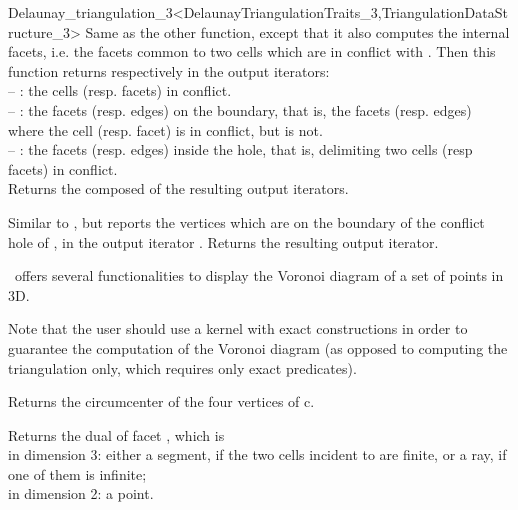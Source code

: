 \begin{ccRefClass}{Delaunay_triangulation_3<DelaunayTriangulationTraits_3,TriangulationDataStructure_3>}
{Same as the other  function, except that it also 
computes the internal facets, i.e. the facets common to two cells which
are in conflict with .
Then this function returns respectively in the output iterators:\\
-- : the cells (resp. facets) in conflict.\\
-- : the facets (resp. edges) on the boundary, that is, the facets
(resp. edges)  where the cell (resp. facet)  is in
conflict, but  is not.\\
-- : the facets (resp. edges) inside the hole, that is, delimiting
two cells (resp facets) in conflict.\\
Returns the  composed of the resulting output iterators.
}

{Similar to , but reports the vertices which are on the
boundary of the conflict hole of , in the output iterator .
Returns the resulting output iterator.
}



\cgal\ offers several functionalities to display the Voronoi diagram of 
a set of points in 3D.

Note that the user should use a kernel with exact constructions in order
to guarantee the computation of the Voronoi diagram (as opposed to computing
the triangulation only, which requires only exact predicates).

{Returns the circumcenter of the four vertices of c.
}

{Returns the dual of facet , which is \\
in dimension 3: either a segment, if the two cells incident to   
are finite, or a ray, if one of them is infinite;\\
in dimension 2: a point.
}


\end{ccRefClass}
